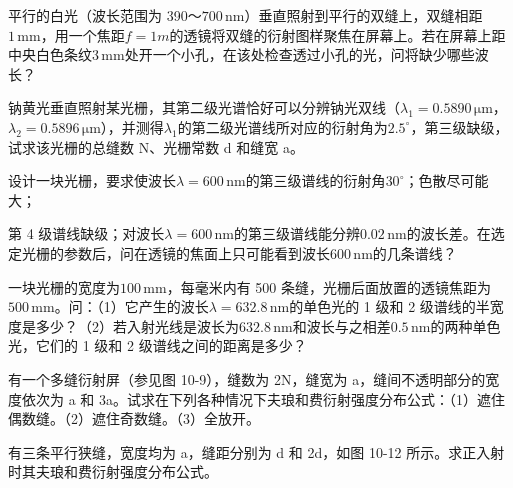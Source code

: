 \documentclass[standard, analysis, notocnum]{ExBook}
\newcommand{\answerarea}[1][8cm]{%
  \par\vspace{2mm}%
  \noindent{\color{themeColor!35}\rule{\linewidth}{0.4pt}}\par
  \noindent\begin{minipage}[t][#1][t]{\linewidth}\vspace{0pt}\end{minipage}\par
  \noindent{\color{themeColor!35}\rule{\linewidth}{0.4pt}}\par
}
\begin{document}
\begin{qitems}[startnum=2]
\qitem 平行的白光（波长范围为 390～$700\,\mathrm{nm}$）垂直照射到平行的双缝上，双缝相距$1\,\mathrm{mm}$，用一个焦距$f=1m$的透镜将双缝的衍射图样聚焦在屏幕上。若在屏幕上距中央白色条纹$3\,\mathrm{mm}$处开一个小孔，在该处检查透过小孔的光，问将缺少哪些波长？
\label{q:241:start}
\answerarea[8cm]
\label{q:241:end}
\end{qitems}

\begin{qitems}[startnum=3]
\qitem 钠黄光垂直照射某光栅，其第二级光谱恰好可以分辨钠光双线（$\lambda_{1}=0.5890\,\mathrm{\mu m}$，$\lambda_{2}=0.5896\,\mathrm{\mu m}$），并测得$\lambda_{1}$的第二级光谱线所对应的衍射角为$2.5^{\circ}$，第三级缺级，试求该光栅的总缝数 N、光栅常数 d 和缝宽 a。
\label{q:242:start}
\answerarea[8cm]
\label{q:242:end}
\end{qitems}

\begin{qitems}[startnum=4]
\qitem 设计一块光栅，要求使波长$\lambda =600\,\mathrm{nm}$的第三级谱线的衍射角$30^{\circ}$；色散尽可能大；
\par\noindent\hspace{2em}第 4 级谱线缺级；对波长$\lambda =600\,\mathrm{nm}$的第三级谱线能分辨$0.02\,\mathrm{nm}$的波长差。在选定光栅的参数后，问在透镜的焦面上只可能看到波长$600\,\mathrm{nm}$的几条谱线？
\label{q:243:start}
\answerarea[8cm]
\label{q:243:end}
\end{qitems}

\begin{qitems}[startnum=5]
\qitem 一块光栅的宽度为$100\,\mathrm{mm}$，每毫米内有 500 条缝，光栅后面放置的透镜焦距为$500\,\mathrm{mm}$。问：（1）它产生的波长$\lambda =632.8\,\mathrm{nm}$的单色光的 1 级和 2 级谱线的半宽度是多少？（2）若入射光线是波长为$632.8\,\mathrm{nm}$和波长与之相差$0.5\,\mathrm{nm}$的两种单色光，它们的 1 级和 2 级谱线之间的距离是多少？
\label{q:244:start}
\answerarea[8cm]
\label{q:244:end}
\end{qitems}

\begin{qitems}[startnum=6]
\qitem 有一个多缝衍射屏（参见图 10-9），缝数为 2N，缝宽为 a，缝间不透明部分的宽度依次为 a 和 3a。试求在下列各种情况下夫琅和费衍射强度分布公式：（1）遮住偶数缝。（2）遮住奇数缝。（3）全放开。
\label{q:245:start}
\answerarea[8cm]
\label{q:245:end}
\end{qitems}

\begin{qitems}[startnum=7]
\qitem 有三条平行狭缝，宽度均为 a，缝距分别为 d 和 2d，如图 10-12 所示。求正入射时其夫琅和费衍射强度分布公式。
\label{q:246:start}
\answerarea[8cm]
\label{q:246:end}
\end{qitems}
\end{document}
